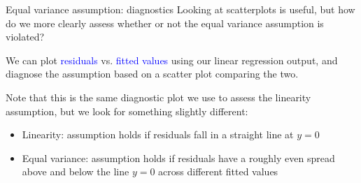 \documentclass[10pt,t]{beamer}
\begin{document}
\begin{frame}{Equal variance assumption: diagnostics}
Looking at scatterplots is useful, but how do we more clearly assess whether or not the equal variance assumption is violated?

\vspace{0.3cm}

We can plot \textcolor{blue}{residuals} vs. \textcolor{blue}{fitted values} using our linear regression output, and diagnose the assumption based on a scatter plot comparing the two.

\vspace{0.3cm}

Note that this is the same diagnostic plot we use to assess the linearity assumption, but we look for something slightly different:

\vspace{0.3cm}

\begin{itemize}
	\item Linearity: assumption holds if residuals fall in a straight line at $y = 0$
	\item Equal variance: assumption holds if residuals have a roughly even spread above and below the line $y = 0$ across different fitted values
\end{itemize}

\end{frame}
\end{document}
